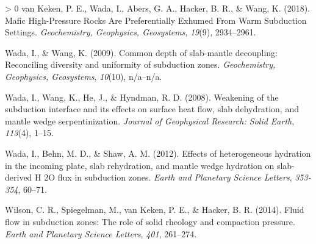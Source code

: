 \documentclass[draft,linenumbers]{agujournal2018}
\newlength{\cslhangindent}
\newenvironment{CSLReferences}[3] %
 {%
  \setlength{\parindent}{0pt}
  \ifodd #1 \everypar{\setlength{\hangindent}{\cslhangindent}}\ignorespaces\fi
  \ifnum #2 > 0
  \setlength{\parskip}{#2\baselineskip}
  \fi
 }%
 {}
\begin{document}
\begin{CSLReferences}{1}{0}
\leavevmode\hypertarget{ref-VanKeken2018}{}%
van Keken, P. E., Wada, I., Abers, G. A., Hacker, B. R., \& Wang, K.
(2018). {Mafic High-Pressure Rocks Are Preferentially Exhumed From Warm
Subduction Settings}. \emph{Geochemistry, Geophysics, Geosystems},
\emph{19}(9), 2934--2961.

\leavevmode\hypertarget{ref-Wada2009}{}%
Wada, I., \& Wang, K. (2009). {Common depth of slab-mantle decoupling:
Reconciling diversity and uniformity of subduction zones}.
\emph{Geochemistry, Geophysics, Geosystems}, \emph{10}(10), n/a--n/a.

\leavevmode\hypertarget{ref-Wada2008}{}%
Wada, I., Wang, K., He, J., \& Hyndman, R. D. (2008). {Weakening of the
subduction interface and its effects on surface heat flow, slab
dehydration, and mantle wedge serpentinization}. \emph{Journal of
Geophysical Research: Solid Earth}, \emph{113}(4), 1--15.

\leavevmode\hypertarget{ref-Wada2012}{}%
Wada, I., Behn, M. D., \& Shaw, A. M. (2012). {Effects of heterogeneous
hydration in the incoming plate, slab rehydration, and mantle wedge
hydration on slab-derived H 2O flux in subduction zones}. \emph{Earth
and Planetary Science Letters}, \emph{353-354}, 60--71.

\leavevmode\hypertarget{ref-Wilson2014}{}%
Wilson, C. R., Spiegelman, M., van Keken, P. E., \& Hacker, B. R.
(2014). {Fluid flow in subduction zones: The role of solid rheology and
compaction pressure}. \emph{Earth and Planetary Science Letters},
\emph{401}, 261--274.

\end{CSLReferences}


\end{document}
